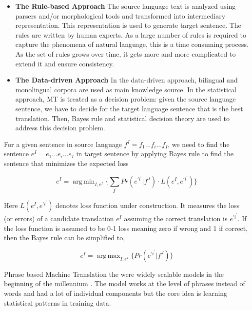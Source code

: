 \documentclass[a4paper]{article}
\DeclareMathOperator*{\argmin}{arg\,min}
\DeclareMathOperator*{\argmax}{arg\,max}
\begin{document}
\begin{itemize}

  \item \textbf{The Rule-based Approach}
        The  source language text is analyzed using parsers and/or morphological
        tools   and   transformed  into    intermediary   representation.   This
        representation  is  used  to  generate  target  sentence.  The rules are
        written  by human  experts. As  a large number of  rules is  required to
        capture  the  phenomena  of natural language,  this is a  time consuming
        process.  As the set of rules grows over time, it gets more and more
        complicated to extend it and ensure consistency.

  \item \textbf{The Data-driven Approach}
        In the data-driven  approach, bilingual and monolingual corpora are used
        as main knowledge source.  In the statistical approach, MT is treated as
        a  decision problem:  given the  source  language  sentence,  we have to
        decide  for the  target language  sentence that is the best translation.
        Then,  Bayes rule  and  statistical  decision theory are used to address
        this decision problem.
\end{itemize}


For a given sentence in source language $f^{I} = f_1\ldots f_i\ldots f_{I} $, we
need to find the sentence $e^{I} = e_1\ldots e_i\ldots e_{I}$ in target sentence
by applying Bayes rule to find the sentence that minimizes the expected loss


\begin{equation*}
e^{I} =  \argmin_{I,e^{I}} \Bigg\{
  \sum_{I^{'} } Pr(e^{\prime i^\prime} | f^J) \cdot L(e^I, e^{\prime i^\prime})
\Bigg\}
\end{equation*}


Here  $L(e^I, e^{\prime i^\prime})$ denotes loss function under construction. It
measures  the loss  (or errors) of a  candidate translation $e^{I}$ assuming the
correct translation is $e^{\prime i^\prime}$. If the loss function is assumed to
be 0-1  loss meaning  zero if wrong and 1 if correct, then the Bayes rule can be
simplified to,


\begin{equation*}
  e^{I} = \argmax_{I,e^{I}} \Bigg\{Pr(e^{\prime i^\prime} | f^J) \Bigg\}
\end{equation*}


Phrase  based  Machine  Translation  the  were widely  scalable  models  in  the
beginning of the millennium \cite{koehn2003statistical}. The model works  at the
level of phrases instead of words and had a lot of individual components but the
core idea is learning statistical patterns in training data.
\end{document}
